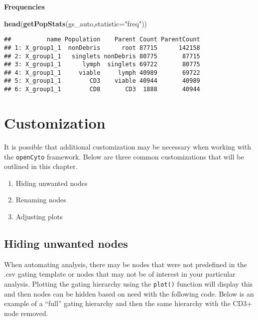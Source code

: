 \documentclass[]{book}
\newenvironment{Shaded}{\begin{snugshade}}{\end{snugshade}}
\newcommand{\DataTypeTok}[1]{\textcolor[rgb]{0.13,0.29,0.53}{#1}}
\newcommand{\KeywordTok}[1]{\textcolor[rgb]{0.13,0.29,0.53}{\textbf{#1}}}
\newcommand{\NormalTok}[1]{#1}
\newcommand{\StringTok}[1]{\textcolor[rgb]{0.31,0.60,0.02}{#1}}
\providecommand{\tightlist}{%
  \setlength{\itemsep}{0pt}\setlength{\parskip}{0pt}}
\begin{document}
\textbf{Frequencies}

\begin{Shaded}
\begin{Highlighting}[]
\KeywordTok{head}\NormalTok{(}\KeywordTok{getPopStats}\NormalTok{(gs_auto,}\DataTypeTok{statistic=}\StringTok{"freq"}\NormalTok{))}
\end{Highlighting}
\end{Shaded}

\begin{verbatim}
##          name Population    Parent Count ParentCount
## 1: X_group1_1  nonDebris      root 87715      142158
## 2: X_group1_1   singlets nonDebris 80775       87715
## 3: X_group1_1      lymph  singlets 69722       80775
## 4: X_group1_1     viable     lymph 40989       69722
## 5: X_group1_1        CD3    viable 40944       40989
## 6: X_group1_1        CD8       CD3  1888       40944
\end{verbatim}

\hypertarget{customization}{%
\chapter{Customization}\label{customization}}

It is possible that additional customization may be necessary when working with the \texttt{openCyto} framework. Below are three common customizations that will be outlined in this chapter.

\begin{enumerate}
\def\labelenumi{\arabic{enumi}.}
\tightlist
\item
  Hiding unwanted nodes
\item
  Renaming nodes
\item
  Adjusting plots
\end{enumerate}

\hypertarget{hiding-unwanted-nodes}{%
\section{Hiding unwanted nodes}\label{hiding-unwanted-nodes}}

When automating analysis, there may be nodes that were not predefined in the .csv gating template or nodes that may not be of interest in your particular analysis. Plotting the gating hierarchy using the \texttt{plot()} function will display this and then nodes can be hidden based on need with the following code. Below is an example of a ``full'' gating hierarchy and then the same hierarchy with the CD3+ node removed.
\end{document}
